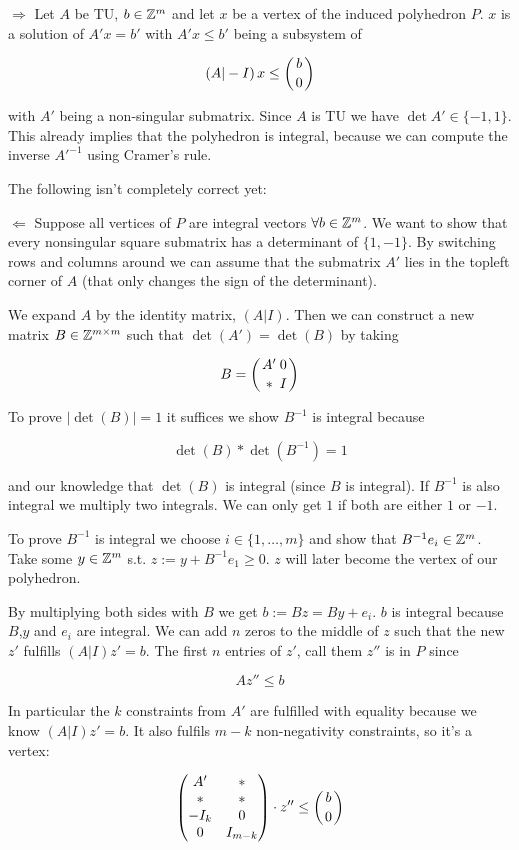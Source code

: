 \begin{pr} $\Rightarrow$ Let $A$ be TU, $b\in \mathbb{Z}^m$ and let $x$ be a vertex of the induced polyhedron $P$. $x$ is a solution of $A'x=b'$ with $A'x\leq b'$ being a subsystem of 

\[\left(A|-I\right) x \leq \left(b\atop 0\right)\]

with $A'$ being a non-singular submatrix. Since $A$ is TU we have $\det A'\in \{-1,1\}$. This already implies that the polyhedron is integral, because we can compute the inverse $A'^{-1}$ using Cramer's rule. %

The following isn't completely correct yet:

$\Leftarrow$ Suppose all vertices of $P$ are integral vectors $\forall b\in \mathbb{Z}^m$. We want to show that every nonsingular square submatrix has a determinant of $\{1,-1\}$. By switching rows and columns around we can assume that the submatrix $A'$ lies in the topleft corner of $A$ (that only changes the sign of the determinant). 

We expand $A$ by the identity matrix, $(A|I)$. Then we can construct a new matrix $B\in \mathbb{Z}^{m\times m}$ such that $\det (A') = \det (B)$ by taking 

\[B = \left({A' \atop *} {0\atop I}\right)\]

To prove $|\det (B)| =1$ it suffices we show $B^{-1}$ is integral because

\[\det(B)*\det(B^{-1}) = 1\]

and our knowledge that $\det (B)$ is integral (since $B$ is integral). If $B^{-1}$ is also integral we multiply two integrals. We can only get $1$ if both are either $1$ or $-1$.

To prove $B^{-1}$ is integral we choose $i\in \{1,\ldots, m\}$ and show that $B^{-1}e_i\in \mathbb{Z}^m$. Take some $y\in \mathbb{Z}^m$ s.t. $z:= y + B^{-1}e_1\geq 0$. $z$ will later become the vertex of our polyhedron. 

By multiplying both sides with $B$ we get $b:= Bz=By+e_i$. $b$ is integral because $B$,$y$ and $e_i$ are integral. We can add $n$ zeros to the middle of $z$ such that the new $z'$ fulfills $(A|I)z'=b$. The first $n$ entries of $z'$, call them $z''$ is in $P$ since

\[Az''\leq b\]

In particular the $k$ constraints from $A'$ are fulfilled with equality because we know $(A|I)z'=b$. It also fulfils $m-k$ non-negativity constraints, so it's a vertex:

\[\begin{pmatrix}
A' & *\\
* & *\\
-I_k & 0 \\
0 & I_{m-k}
\end{pmatrix} \cdot z'' \leq \left(b \atop 0\right)\]


\end{pr}
